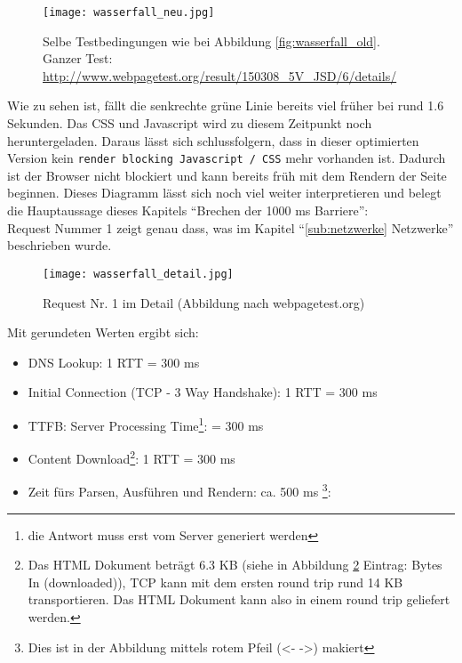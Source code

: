 	  \begin{figure}[htbp]
	  	\begin{center}
	  		\texttt{[image: wasserfall\_neu.jpg]}
	  		\caption{Selbe Testbedingungen wie bei Abbildung \ref{fig:wasserfall_old}. Ganzer Test: \url{http://www.webpagetest.org/result/150308_5V_JSD/6/details/}}
	  		\label{fig:wasserfall_neu}
	  	\end{center}
	  \end{figure}
	  Wie zu sehen ist, fällt die senkrechte grüne Linie bereits viel früher bei rund 1.6 Sekunden. Das CSS und Javascript wird zu diesem Zeitpunkt noch heruntergeladen. Daraus lässt sich schlussfolgern, dass in dieser optimierten Version kein \texttt{render blocking Javascript / CSS} mehr vorhanden ist. Dadurch ist der Browser nicht blockiert und kann bereits früh mit dem Rendern der Seite beginnen. Dieses Diagramm lässt sich noch viel weiter interpretieren und belegt die Hauptaussage dieses Kapitels "`Brechen der 1000 ms Barriere"':\\
	  Request Nummer 1 zeigt genau dass, was im Kapitel "`\ref{sub:netzwerke} Netzwerke"' beschrieben wurde. 
	  
	  \begin{figure}[htbp]
	  	\begin{center}
	  		\texttt{[image: wasserfall\_detail.jpg]}
	  		\caption{Request Nr. 1 im Detail (Abbildung nach webpagetest.org)}
	  		\label{fig:wasserfall_detail}
	  	\end{center}
	  \end{figure} 

	  Mit gerundeten Werten ergibt sich:

	  \begin{itemize}
	  	\item DNS Lookup: 1 RTT = 300 ms
	  	\item Initial Connection (TCP - 3 Way Handshake): 1 RTT = 300 ms
	  	\item TTFB: Server Processing Time\footnote{die Antwort muss erst vom Server generiert werden}: = 300 ms
	  	\item Content Download\footnote{Das HTML Dokument beträgt 6.3 KB (siehe in Abbildung \ref{fig:wasserfall_detail} Eintrag: Bytes In (downloaded)), TCP kann mit dem ersten round trip rund 14 KB transportieren. Das HTML Dokument kann also in einem round trip geliefert werden.}: 1 RTT = 300 ms 
	  	\item Zeit fürs Parsen, Ausführen und Rendern: ca. 500 ms \footnote{Dies ist in der Abbildung mittels rotem Pfeil (<- ->) makiert}:  
	  \end{itemize}
 
